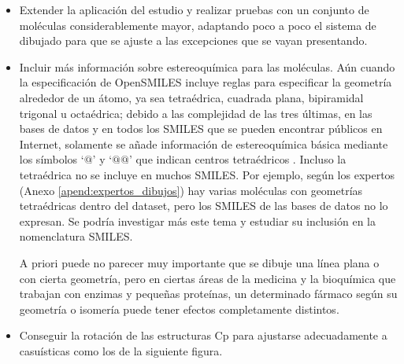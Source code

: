 \begin{itemize}
    \item Extender la aplicación del estudio y realizar pruebas con un conjunto de moléculas considerablemente mayor, adaptando poco a poco el sistema de dibujado para que se ajuste a las excepciones que se vayan presentando.
    
    \item Incluir más información sobre estereoquímica para las moléculas. Aún cuando la especificación de OpenSMILES incluye reglas para especificar la geometría alrededor de un átomo, ya sea tetraédrica, cuadrada plana, bipiramidal trigonal u octaédrica; debido a las complejidad de las tres últimas, en las bases de datos y en todos los SMILES que se pueden encontrar públicos en Internet, solamente se añade información de estereoquímica básica mediante los símbolos `$@$' y `$@@$' que indican centros tetraédricos \cite{opensmiles, crystallography_quiros}. Incluso la tetraédrica no se incluye en muchos SMILES. Por ejemplo, según los expertos (Anexo \ref{apend:expertos_dibujos}) hay varias moléculas con geometrías tetraédricas dentro del dataset, pero los SMILES de las bases de datos no lo expresan. Se podría investigar más este tema y estudiar su inclusión en la nomenclatura SMILES.
    
    A priori puede no parecer muy importante que se dibuje una línea plana o con cierta geometría, pero en ciertas áreas de la medicina y la bioquímica que trabajan con enzimas y pequeñas proteínas, un determinado fármaco según su geometría o isomería puede tener efectos completamente distintos.
    
    \item Conseguir la rotación de las estructuras Cp para ajustarse adecuadamente a casuísticas como los de la siguiente figura. 
    

\end{itemize}
